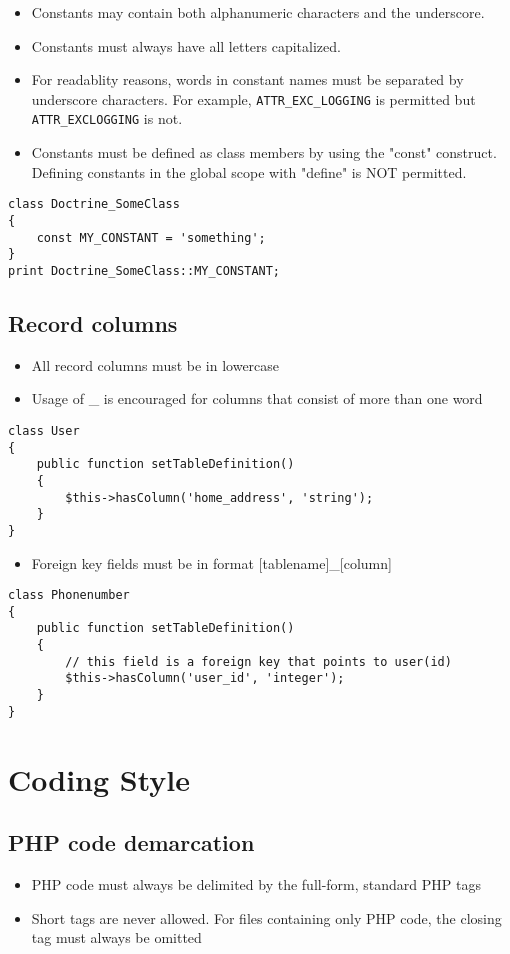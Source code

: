 \documentclass[11pt,a4paper]{report}
\begin{document}
\begin{itemize}
\item{Constants may contain both alphanumeric characters and the underscore.}
\item{Constants must always have all letters capitalized.}
\item{For readablity reasons, words in constant names must be separated by underscore characters. For example, \texttt{ATTR\_EXC\_LOGGING} is permitted but \texttt{ATTR\_EXCLOGGING} is not.}
\item{Constants must be defined as class members by using the "const" construct. Defining constants in the global scope with "define" is NOT permitted.}
\end{itemize}
\begin{verbatim}
class Doctrine_SomeClass
{
    const MY_CONSTANT = 'something';
}
print Doctrine_SomeClass::MY_CONSTANT;
\end{verbatim}

\subsection{Record columns}
\begin{itemize}
\item{All record columns must be in lowercase}
\item{Usage of \_ is encouraged for columns that consist of more than one word}
\end{itemize}
\begin{verbatim}
class User
{
    public function setTableDefinition()
    {
        $this->hasColumn('home_address', 'string');
    }
}
\end{verbatim}

\begin{itemize}
\item{Foreign key fields must be in format [tablename]\_[column]}
\end{itemize}
\begin{verbatim}
class Phonenumber
{
    public function setTableDefinition()
    {
        // this field is a foreign key that points to user(id)
        $this->hasColumn('user_id', 'integer');
    }
}
\end{verbatim}

\section{Coding Style}
\subsection{PHP code demarcation}
\begin{itemize}
\item{PHP code must always be delimited by the full-form, standard PHP tags}
\item{Short tags are never allowed. For files containing only PHP code, the closing tag must always be omitted}
\end{itemize}
\end{document}
